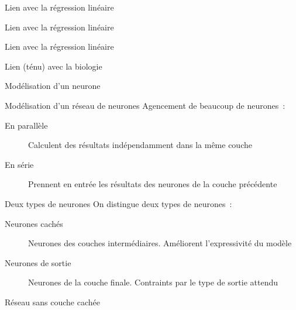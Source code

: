\begin{frame}{Lien avec la régression linéaire}
\end{frame}

\begin{frame}{Lien avec la régression linéaire}
\end{frame}

\begin{frame}{Lien avec la régression linéaire}
\end{frame}

\begin{frame}{Lien (ténu) avec la biologie}
\end{frame}

\begin{frame}{Modélisation d'un neurone}
\end{frame}

\begin{frame}{Modélisation d'un réseau de neurones}
  Agencement de beaucoup de neurones~:
  \begin{description}
    \item[En parallèle] Calculent des résultats indépendamment dans la même couche
    \item[En série] Prennent en entrée les résultats des neurones de la couche précédente
  \end{description}
\end{frame}

\begin{frame}{Deux types de neurones}
  On distingue deux types de neurones~:
  \begin{description}
    \item[Neurones cachés] Neurones des couches intermédiaires. Améliorent l'expressivité du modèle
    \item[Neurones de sortie] Neurones de la couche finale. Contraints par le type de sortie attendu
  \end{description}
\end{frame}

\begin{frame}{Réseau sans couche cachée}
  \centering
\end{frame}


